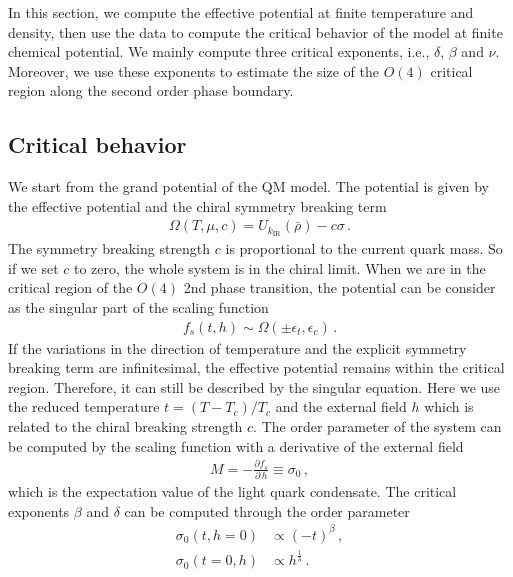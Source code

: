 \documentclass[aps,twocolumn,prd,superscriptaddress,nofootinbib,floatfix]{revtex4-2}
\begin{document}
In this section, we compute the effective potential at finite temperature and density, then use the data to compute the critical behavior of the model at finite chemical potential. We mainly compute three critical exponents, i.e., $\delta$, $\beta$ and $\nu$. Moreover, we use these exponents to estimate the size of the $O(4)$ critical region along the second order phase boundary.
%
\subsection{Critical behavior}
\label{subsec:CE}
We start from the grand potential of the QM model. The potential is given by the effective potential and the chiral symmetry breaking term
%
\begin{align}
\Omega(T,\mu,c)=U_{k_\mathrm{IR}}(\bar\rho)-c\sigma\,.
\end{align}
%
The symmetry breaking strength $c$ is proportional to the current quark mass. So if we set $c$ to zero, the whole system is in the chiral limit. When we are in the critical region of the $O(4)$ 2nd phase transition, the potential can be consider as the singular part of the scaling function
%
\begin{align}
f_s(t,h)\sim \Omega(\pm\epsilon_t,\epsilon_c)\,.
\end{align}
%
If the variations in the direction of temperature and the explicit symmetry breaking term are infinitesimal, the effective potential remains within the critical region. Therefore, it can still be described by the singular equation. Here we use the reduced temperature $t=(T-T_c)/T_c$ and the external field $h$ which is related to the chiral breaking strength $c$. The order parameter of the system can be computed by the scaling function with a derivative of the external field
%
\begin{align}
M=-\frac{\partial f_s}{\partial\,h}\equiv \sigma_0\,,
\end{align}
%
which is the expectation value of the light quark condensate. The critical exponents $\beta$ and $\delta$ can be computed through the order parameter
%
\begin{align}
\sigma_0(t,h=0)&\propto (-t)^\beta\,,\label{eq:beta}\\[2ex]
\sigma_0(t=0,h)&\propto h^{\frac{1}{\delta}}\label{eq:delta}\,.
\end{align}
\end{document}

